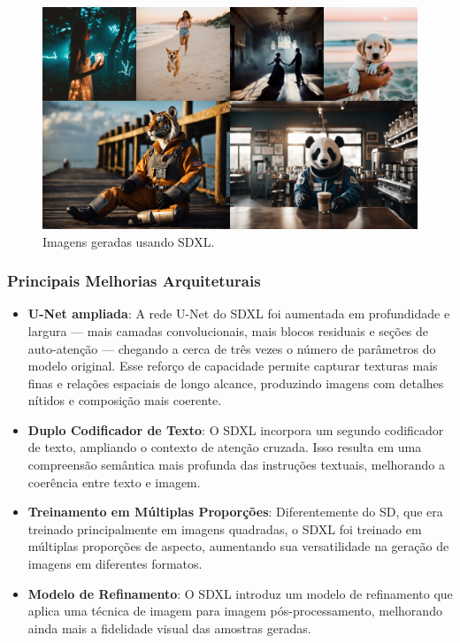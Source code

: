 \documentclass[12pt, %
openright, 
oneside, %
a4paper,    %
brazil]{facom-ufu-abntex2}
\begin{document}
\begin{figure}[H]
    \centering
        \includegraphics[width=\linewidth]{sdxl-sample-2.png}
        \caption{Imagens geradas usando SDXL.}
        \label{fig:sdxlSample2}
\end{figure}

\subsubsection*{Principais Melhorias Arquiteturais}

\begin{itemize}
    \item \textbf{U-Net ampliada}: A rede U-Net do SDXL foi aumentada em profundidade e largura — mais camadas convolucionais, mais blocos residuais e seções de auto-atenção — chegando a cerca de três vezes o número de parâmetros do modelo original. Esse reforço de capacidade permite capturar texturas mais finas e relações espaciais de longo alcance, produzindo imagens com detalhes nítidos e composição mais coerente.
    \item \textbf{Duplo Codificador de Texto}: O SDXL incorpora um segundo codificador de texto, ampliando o contexto de atenção cruzada. Isso resulta em uma compreensão semântica mais profunda das instruções textuais, melhorando a coerência entre texto e imagem.
    \item \textbf{Treinamento em Múltiplas Proporções}: Diferentemente do SD, que era treinado principalmente em imagens quadradas, o SDXL foi treinado em múltiplas proporções de aspecto, aumentando sua versatilidade na geração de imagens em diferentes formatos.
    \item \textbf{Modelo de Refinamento}: O SDXL introduz um modelo de refinamento que aplica uma técnica de imagem para imagem pós-processamento, melhorando ainda mais a fidelidade visual das amostras geradas.
\end{itemize}
\end{document}
